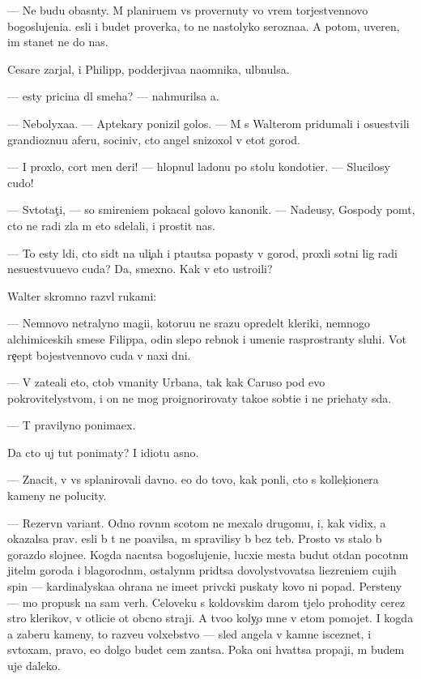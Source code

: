 \documentclass[10pt]{book}
\begin{document}
— Ne budu ob{\y}asn{\ia}ty. M{\yi} planiru{\y}em vs{\e} provernuty vo vrem{\ia} torjestvennovo bogoslujeni{\y}a. {\Y}esli i budet proverka, to ne nastolyko ser{\y}ozna{\y}a. A potom, uveren, im stanet ne do nas.

Cesare zarjal, i Philipp, podderjiva{\y}a na\-{\y}om\-ni\-ka, ul{\yi}bnulsa.

— {\Y}esty pricina dl{\ia} smeha? — nahmurilsa {\y}a.

— Nebolyxa{\y}a. — Aptekary ponizil golos. — M{\yi} s Walterom pridumali i osu\-{\x}estvi\-li grandioznu{\y}u aferu, sociniv, cto angel snizoxol v etot gorod.

— I proxlo, cort men{\ia} deri! — hlopnul ladon{\y}u po stolu kondotier. — Slucilosy cudo!

— Sv{\ia}totat{\c}i, — so smireni{\y}em pokacal go\-lo\-vo{\y} kanonik. — Nade{\y}usy, Gospody po{\y}m{\e}t, cto ne radi zla m{\yi} eto sdelali, i prostit nas.

— To {\y}esty l{\io}di, cto sid{\ia}t na uli{\c}ah i p{\yi}ta{\y}utsa popasty v gorod, proxli sotni lig radi nesu{\x}estvu{\y}u{\x}evo cuda? Da, smexno. Kak v{\yi} eto ustro{\y}ili?

Walter skromno razv{\e}l rukami:

— Nemnovo ne{\y}tralyno{\y} magi{\y}i, kotoru{\y}u ne srazu opredel{\ia}t kleriki, nemnogo alchimiceskih smese{\y} Filippa, odin slepo{\y} reb{\e}nok i umeni{\y}e rasprostran{\ia}ty sluhi. Vot re{\c}ept bojestvennovo cuda v naxi dni.

— V{\yi} zate{\y}ali eto, ctob{\yi} v{\yi}manity Urbana, tak kak Caruso pod {\y}evo po\-kro\-vi\-tely\-stvom, i on ne mog proignorirovaty tako{\y}e sob{\yi}ti{\y}e i ne pri{\y}ehaty s{\io}da.

— T{\yi} pravilyno ponima{\y}ex.

Da cto uj tut ponimaty? I idiotu {\y}asno.

— Znacit, v{\yi} vs{\e} splanirovali davno. {\Y}e{\x}o do tovo, kak pon{\ia}li, cto s kollek{\c}ionera kameny ne polucity.

— Rezervn{\yi}{\y} variant. Odno rovn{\yi}m scotom ne mexalo drugomu, i, kak vidix, {\y}a okazalsa prav. {\Y}esli b{\yi} t{\yi} ne po{\y}avilsa, m{\yi} spravilisy b{\yi} bez teb{\ia}. Prosto vs{\e} stalo b{\yi} gorazdo slojne{\y}e. Kogda nacn{\e}tsa bogoslujeni{\y}e, lucxi{\y}e mesta budut otdan{\yi} pocotn{\yi}m jitel{\ia}m go\-ro\-da i blagorodn{\yi}m, ostalyn{\yi}m prid{\e}tsa dovolystvovatsa li\-{\c}e\-zre\-ni\-{\y}em cujih spin — kardinalyska{\y}a ohrana ne ime{\y}et priv{\yi}cki puskaty kovo ni popad{\ia}. Persteny — mo{\y} propusk na sam{\yi}{\y} verh. Celoveku s koldovskim darom t{\ia}jelo prohodity cerez stro{\y} klerikov, v otlici{\y}e ot ob{\yi}cno{\y} straji. A tvo{\y}o koly{\c}o mne v etom pomojet. I kogda {\y}a zaberu kameny, to razve{\y}u volxebstvo — sled angela v kamne isceznet, i sv{\ia}toxam, pravo, {\y}e{\x}o dolgo budet cem zan{\ia}tsa. Poka oni hvat{\ia}tsa propaji, m{\yi} budem uje daleko.
\end{document}
